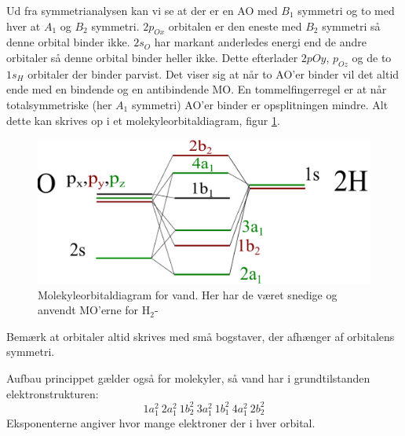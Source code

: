 \documentclass[../../Atom-ogMolekylefysik.tex]{subfiles}
\begin{document}
Ud fra symmetrianalysen kan vi se at der er en AO med $B_1$ symmetri og to med hver at $A_1$ og $B_2$ symmetri.
$2p_{Ox}$ orbitalen er den eneste med $B_2$ symmetri så denne orbital binder ikke. $2s_O$ har markant anderledes energi end de andre orbitaler så denne orbital binder heller ikke. Dette efterlader $2p{Oy}$, $p_{Oz}$ og de to $1s_H$ orbitaler der binder parvist. Det viser sig at når to AO'er binder vil det altid ende med en bindende og en antibindende MO. En tommelfingerregel er at når totalsymmetriske (her $A_1$ symmetri) AO'er binder er opsplitningen mindre.
Alt dette kan skrives op i et molekyleorbitaldiagram, figur \ref{fig:amo:MOvand}.
\begin{figure}
    \centering
    \includegraphics[width = \textwidth]{Atom-ogMolekylefysik/billeder/vandMOD.pdf}
    \caption{Molekyleorbitaldiagram for vand. Her har de været snedige og anvendt MO'erne for H$_2$-}
    \label{fig:amo:MOvand}
\end{figure}
Bemærk at orbitaler altid skrives med små bogstaver, der afhænger af orbitalens symmetri.

Aufbau princippet gælder også for molekyler, så vand har i grundtilstanden elektronstrukturen:
$$
1a_1^2~2a_1^2~1b_2^2~3a_1^2~1b_1^2~4a_1^2~2b_2^2
$$
Eksponenterne angiver hvor mange elektroner der i hver orbital.
\end{document}
